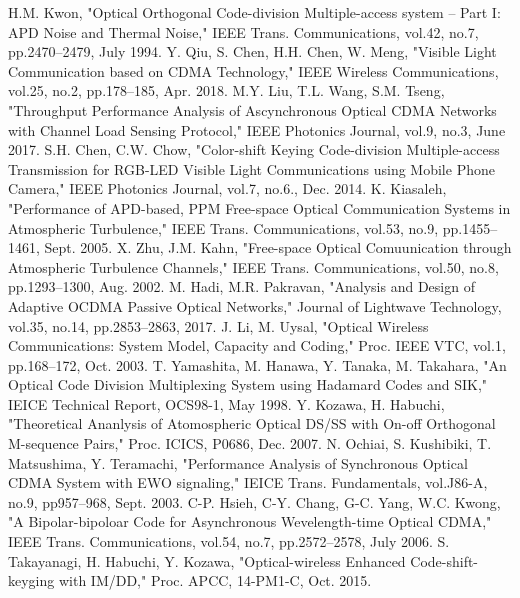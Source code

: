 ﻿\documentclass[a4j,10pt]{jarticle}
\begin{document}
\begin{thebibliography}{99} %
 H.M. Kwon, "Optical Orthogonal Code-division Multiple-access 
system -- Part I: APD Noise and Thermal Noise," IEEE Trans. Communications,
vol.42, no.7, pp.2470--2479, July 1994. 
%
 Y. Qiu, S. Chen, H.H. Chen, W. Meng, 
"Visible Light Communication based on CDMA Technology," IEEE Wireless Communications, 
vol.25, no.2, pp.178--185, Apr. 2018.
%
 M.Y. Liu, T.L. Wang, S.M. Tseng, 
"Throughput Performance Analysis of Ascynchronous Optical CDMA Networks 
with Channel Load Sensing Protocol," IEEE Photonics Journal, 
vol.9, no.3, June 2017.
%
 S.H. Chen, C.W. Chow, 
"Color-shift Keying Code-division Multiple-access Transmission for 
RGB-LED Visible Light Communications using Mobile Phone Camera," 
IEEE Photonics Journal, vol.7, no.6., Dec. 2014. 
%
 K. Kiasaleh, 
"Performance of APD-based, PPM Free-space Optical Communication Systems in Atmospheric Turbulence," 
IEEE Trans. Communications, vol.53, no.9, pp.1455--1461, Sept. 2005. 
%
 X. Zhu, J.M. Kahn, 
"Free-space Optical Comuunication through Atmospheric Turbulence Channels," 
IEEE Trans. Communications, vol.50, no.8, pp.1293--1300, Aug. 2002.
%
%
 M. Hadi, M.R. Pakravan, 
"Analysis and Design of Adaptive OCDMA Passive Optical Networks," 
Journal of Lightwave Technology, vol.35, no.14, pp.2853--2863, 2017. 
%
 J. Li, M. Uysal,  
"Optical Wireless Communications: System Model, Capacity and Coding," 
Proc. IEEE VTC, vol.1, pp.168--172, Oct. 2003. 
%
 T. Yamashita, M. Hanawa, Y. Tanaka, M. Takahara, 
"An Optical Code Division Multiplexing System using Hadamard Codes and SIK," 
IEICE Technical Report, OCS98-1, May 1998. 
%
 Y. Kozawa, H. Habuchi, 
"Theoretical Ananlysis of Atomospheric Optical DS/SS with On-off Orthogonal 
M-sequence Pairs," Proc. ICICS, P0686, Dec. 2007. 
%
 N. Ochiai, S. Kushibiki, T. Matsushima, Y. Teramachi, 
"Performance Analysis of Synchronous Optical CDMA System with EWO signaling," 
IEICE Trans. Fundamentals, vol.J86-A, no.9, pp957--968, Sept. 2003. 
%
%
 C-P. Hsieh, C-Y. Chang, G-C. Yang, W.C. Kwong, 
"A Bipolar-bipoloar Code for Asynchronous Wevelength-time Optical CDMA," 
IEEE Trans. Communications, vol.54, no.7, pp.2572--2578, July 2006. 
%
 S. Takayanagi, H. Habuchi, Y. Kozawa, 
"Optical-wireless Enhanced Code-shift-keyging with IM/DD," 
Proc. APCC, 14-PM1-C, Oct. 2015.
\end{thebibliography}
\end{document}
